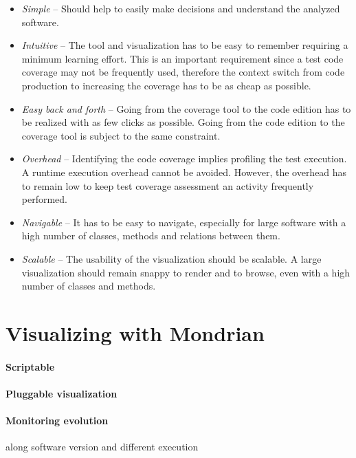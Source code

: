 \documentclass[runningheads]{llncs}
\begin{document}
\begin{itemize}
\item \emph{Simple} -- Should help to easily make decisions and understand the analyzed software. %
\item \emph{Intuitive} -- The tool and visualization has to be easy to remember requiring a minimum learning effort. This is an important requirement since a test code coverage may not be frequently used, therefore the context switch from code production to increasing the coverage has to be as cheap as possible. 
\item \emph{Easy back and forth} -- Going from the coverage tool to the code edition has to be realized with as few clicks as possible. Going from the code edition to the coverage tool is subject to the same constraint. 
\item \emph{Overhead} -- Identifying the code coverage implies profiling the test execution. A runtime execution overhead cannot be avoided. However, the overhead has to remain low to keep test coverage assessment an activity frequently performed. 
\item \emph{Navigable} -- It has to be easy to navigate, especially for large software with a high number of classes, methods and relations between them.
\item \emph{Scalable} -- The usability of the visualization should be scalable. A large visualization should remain snappy to render and to browse, even with a high number of classes and methods.
\end{itemize}


\section{Visualizing with Mondrian}

\paragraph{Scriptable}

\paragraph{Pluggable visualization}

\paragraph{Monitoring evolution} along software version and different execution
\end{document}

